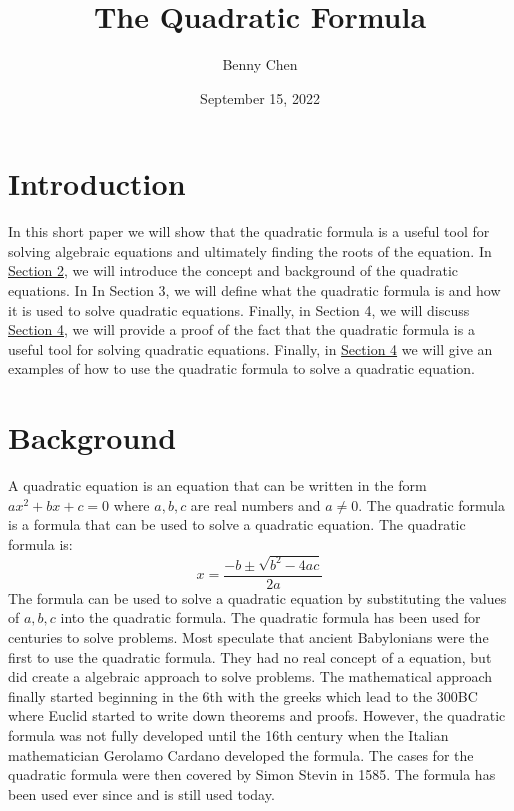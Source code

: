 \documentclass{article}
\title{The Quadratic Formula}
\author{Benny Chen}
\date{September 15, 2022}
\begin{document}
\maketitle

\section{Introduction}
In this short paper we will show that the quadratic formula is a useful tool for solving algebraic equations and ultimately
finding the roots of the equation. In \hyperref[sec:Background]{Section 2}, we will introduce the concept and background of the quadratic equations. In
In Section 3, we will define what the quadratic formula is and how it is used to solve quadratic equations. Finally, in Section 4, we will discuss
\hyperref[sec:Proof]{Section 4}, we will provide a proof of the fact that the quadratic formula 
is a useful tool for solving quadratic equations. Finally, in \hyperref[sec:Examples]{Section 4} we will 
give an examples of how to use the quadratic formula to solve a quadratic equation.

\section{Background}
\label{sec:Background}
A quadratic equation is an equation that can be written in the form $ax^2 + bx + c = 0$ where $a, b, c$ are real numbers and 
$a \neq 0$. The quadratic formula is a formula that can be used to solve a quadratic equation. The quadratic formula is:
\[x = \frac{-b \pm \sqrt{b^2 - 4ac}}{2a}\]
The formula can be used to solve a quadratic equation by substituting the values of
$a, b, c$ into the quadratic formula. The quadratic formula has been used for centuries to solve problems. Most speculate that
ancient Babylonians were the first to use the quadratic formula. They had no real concept of a equation, but did create a 
algebraic approach to solve problems. The mathematical approach finally started beginning in the 6th with the greeks which 
lead to the 300BC where Euclid started to write down theorems and proofs. However, the quadratic formula was not fully 
developed until the 16th century when the Italian mathematician Gerolamo Cardano developed the formula. The cases for 
the quadratic formula were then covered by Simon Stevin in 1585. The formula has been used ever since and is still used
today. \\\\
\end{document}
